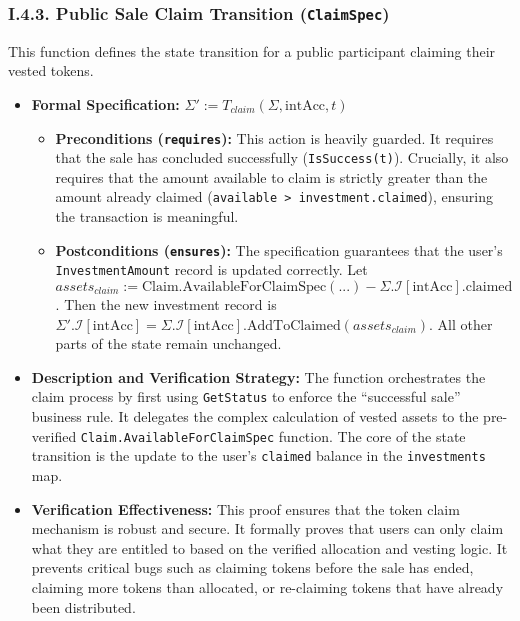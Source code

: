 \documentclass[
  english,
  onecolumn]{article}
\providecommand{\tightlist}{%
  \setlength{\itemsep}{0pt}\setlength{\parskip}{0pt}}
\begin{document}
\subsubsection{\texorpdfstring{I.4.3. Public Sale Claim Transition
(\texttt{ClaimSpec})}{I.4.3. Public Sale Claim Transition (ClaimSpec)}}\label{i.4.3.-public-sale-claim-transition-claimspec}

This function defines the state transition for a public participant
claiming their vested tokens.

\begin{itemize}
\tightlist
\item
  \textbf{Formal Specification:}
  \(\Sigma' := T_{claim}(\Sigma, \text{intAcc}, t)\)

  \begin{itemize}
  \tightlist
  \item
    \textbf{Preconditions (\texttt{requires}):} This action is heavily
    guarded. It requires that the sale has concluded successfully
    (\texttt{IsSuccess(t)}). Crucially, it also requires that the amount
    available to claim is strictly greater than the amount already
    claimed (\texttt{available\ \textgreater{}\ investment.claimed}),
    ensuring the transaction is meaningful.
  \item
    \textbf{Postconditions (\texttt{ensures}):} The specification
    guarantees that the user's \texttt{InvestmentAmount} record is
    updated correctly. Let
    \(assets_{claim} := \text{Claim.AvailableForClaimSpec}(...) - \Sigma.\mathcal{I}[\text{intAcc}].\text{claimed}\).
    Then the new investment record is
    \(\Sigma'.\mathcal{I}[\text{intAcc}] = \Sigma.\mathcal{I}[\text{intAcc}].\text{AddToClaimed}(assets_{claim})\).
    All other parts of the state remain unchanged.
  \end{itemize}
\item
  \textbf{Description and Verification Strategy:} The function
  orchestrates the claim process by first using \texttt{GetStatus} to
  enforce the ``successful sale'' business rule. It delegates the
  complex calculation of vested assets to the pre-verified
  \texttt{Claim.AvailableForClaimSpec} function. The core of the state
  transition is the update to the user's \texttt{claimed} balance in the
  \texttt{investments} map.
\item
  \textbf{Verification Effectiveness:} This proof ensures that the token
  claim mechanism is robust and secure. It formally proves that users
  can only claim what they are entitled to based on the verified
  allocation and vesting logic. It prevents critical bugs such as
  claiming tokens before the sale has ended, claiming more tokens than
  allocated, or re-claiming tokens that have already been distributed.
\end{itemize}
\end{document}
